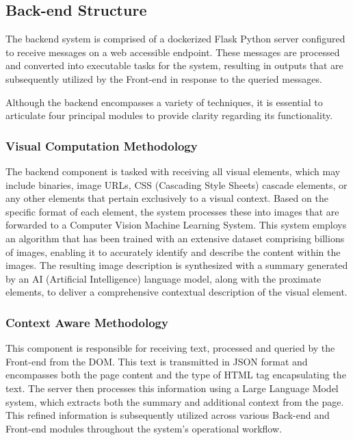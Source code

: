 \documentclass[conference]{IEEEtran}
\begin{document}
\subsection{Back-end Structure}

The backend system is comprised of a dockerized Flask Python server configured to receive messages on a web accessible endpoint. These messages are processed and converted into executable tasks for the system, resulting in outputs that are subsequently utilized by the Front-end in response to the queried messages. 

Although the backend encompasses a variety of techniques, it is essential to articulate four principal modules to provide clarity regarding its functionality.

\subsubsection{Visual Computation Methodology}

The backend component is tasked with receiving all visual elements, which may include binaries, image URLs, CSS (Cascading Style Sheets) cascade elements, or any other elements that pertain exclusively to a visual context. Based on the specific format of each element, the system processes these into images that are forwarded to a Computer Vision Machine Learning System. This system employs an algorithm that has been trained with an extensive dataset comprising billions of images, enabling it to accurately identify and describe the content within the images. The resulting image description is synthesized with a summary generated by an AI (Artificial Intelligence) language model, along with the proximate elements, to deliver a comprehensive contextual description of the visual element.

\subsubsection{Context Aware Methodology}

This component is responsible for receiving text, processed and queried by the Front-end from the DOM. This text is transmitted in JSON format and encompasses both the page content and the type of HTML tag encapsulating the text. The server then processes this information using a Large Language Model system, which extracts both the summary and additional context from the page. This refined information is subsequently utilized across various Back-end and Front-end modules throughout the system's operational workflow.
\end{document}

